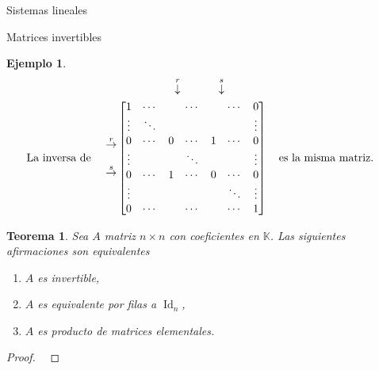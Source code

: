 \documentclass[a4paper,12pt,twoside,spanish,reqno]{amsbook}
\newtheorem{teorema}{Teorema}[section]
\theoremstyle{definition}
\newtheorem{ejemplo}{Ejemplo}[section]
\theoremstyle{remark}
\newcommand{\Id}{\operatorname{Id}}
\newcommand{\K}{\mathbb K}
\begin{document}
\begin{chapter}{Sistemas lineales}
\begin{section}{Matrices invertibles}
\begin{ejemplo}
            \begin{align*}
            &\begin{matrix}
            {}^{}&{}^{}&{}^{}&{}^{}&{}^{}&\overset{r}{\downarrow}&{}^{}&{}^{}&{}^{}{}^{}\overset{s}{\downarrow}&{}^{}
            \end{matrix} \\
            \text{La inversa de \quad}\begin{matrix}
            {}^{}\\{}^{}\\
            \overset{r}{\to}\\
            {}^{}\\
            \overset{s}{\to}\\{}^{}\\
            {}^{}
            \end{matrix}
            &\begin{bmatrix}
            1 & \cdots &  &\cdots &&\cdots& 0  \\
            \vdots  & \ddots  & & &&& \vdots \\
            0 & \cdots &0 &\cdots&1&\cdots &0 \\
            \vdots  &   & &\ddots &&& \vdots \\
            0  & \cdots  &1 &\cdots &0& \cdots& 0 \\
            \vdots  &   & & &&\ddots& \vdots \\
            0  & \cdots  & &\cdots &&\cdots& 1
            \end{bmatrix}
            \text{\quad es la misma matriz.\quad}
            \end{align*}
        
                        
        
    
\end{ejemplo}
        
        
            
            
            \begin{teorema}\label{mtrx-inv-equiv} Sea $A$ matriz $n \times n$ con coeficientes en $\K$. Las siguientes afirmaciones son equivalentes
                \begin{enumerate}
                    \item[\textit{i})] $A$ es invertible,
                    \item[\textit{ii})] $A$  es equivalente por filas a $\Id_n$, 
                    \item[\textit{iii})] $A$ es producto de matrices elementales.
                \end{enumerate}
            \end{teorema}
            \begin{proof}
                \


\end{proof}
\end{section}
\end{chapter}
\end{document}
